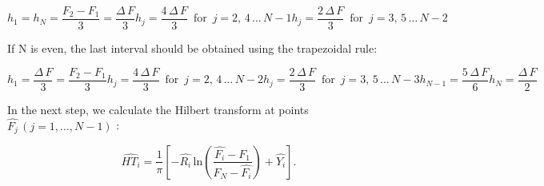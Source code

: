 \documentclass[12pt,twoside,a4paper]{article}
\numberwithin{equation}{subsection}
\numberwithin{figure}{subsection}
\begin{document}
\begin{subequations} \label{eq:htran_nodd}
  \begin{equation}   \label{eq:hnodd_fnlast}
    h_1 = h_N = \frac {F_2 - F_1}{3} = \frac {\Delta \, F}{3}
  \end{equation}
  \begin{equation}   \label{eq:hnodd_even}
    h_j = \frac {4 \, \Delta \, F}{3}  \, \mbox{ for } \, j = 2, \, 4 \, \ldots \, {N - 1}
  \end{equation}
  \begin{equation}   \label{eq:hnodd_odd}
    h_j = \frac {2 \, \Delta \, F}{3}  \, \mbox{ for } \, j = 3, \, 5 \, \ldots \, {N - 2}
  \end{equation}
\end{subequations}

If N is even, the last interval should be obtained using the trapezoidal rule:

\begin{subequations} \label{eq:htran_neven}
  \begin{equation}   \label{eq:hneven_first}
    h_1 = \frac {\Delta \, F}{3} = \frac {F_2 - F_1}{3}
  \end{equation}
  \begin{equation}   \label{eq:hneven_even}
    h_j = \frac {4 \, \Delta \, F}{3}  \, \mbox{ for } \, j = 2, \, 4 \, \ldots \, {N - 2}
  \end{equation}
  \begin{equation}   \label{eq:hneven_odd}
    h_j = \frac {2 \, \Delta \, F}{3}  \, \mbox{ for } \, j = 3, \, 5 \, \ldots \, {N - 3}
  \end{equation}
   \begin{equation}   \label{eq:hneven_prelast}
    h_{N - 1} = \frac {5 \, \Delta \, F}{6}
  \end{equation}
   \begin{equation}   \label{eq:hneven_last}
    h_N = \frac {\Delta \, F}{2}
  \end{equation}
\end{subequations}

In the next step, we calculate the Hilbert transform at points $\widehat{F_j} \, (j = 1, \ldots, N-1)$ :  

\begin{equation} \label{eq:htran_htpoints}
  \widehat{HT_i} = \frac {1}{\pi} 
  \left[ -  \widehat{R_i}
         \, \mathrm{ln}(\frac {\widehat{F_i} - F_1}{F_N - \widehat{F_i} })
         +  \widehat{Y_i} 
  \right].
\end{equation}
\end{document}
